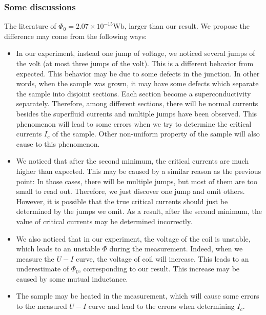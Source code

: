 \subsubsection{Some discussions}

The literature of $\Phi_{0}=2.07\times10^{-15}\mathrm{Wb}$, larger
than our result. We propose the difference may come from the following
ways:
\begin{itemize}
\item In our experiment, instead one jump of voltage, we noticed several jumps
of the volt (at most three jumps of the volt). This is a different
behavior from expected. This behavior may be due to some defects in
the junction. In other words, when the sample was grown, it may have
some defects which separate the sample into disjoint sections. Each
section become a superconductivity separately. Therefore, among different
sections, there will be normal currents besides the superfluid currents
and multiple jumps have been observed. This phenomenon will lead to some
errors when we try to determine the critical currents $I_{c}$ of
the sample. Other non-uniform property of the sample will also cause
to this phenomenon.
\item We noticed that after the second minimum, the critical currents are
much higher than expected. This may be caused by a similar reason
as the previous point: In those cases, there will be multiple jumps,
but most of them are too small to read out. Therefore, we just discover
one jump and omit others. However, it is possible that the true critical
currents should just be determined by the jumps we omit. As a result,
after the second minimum, the value of critical currents may be determined
incorrectly.
\item We also noticed that in our experiment, the voltage of the coil is
unstable, which leads to an unstable $\Phi$ during the measurement.
Indeed, when we measure the $U-I$ curve, the voltage of coil will
increase. This leads to an underestimate of $\Phi_{0}$, corresponding
to our result. This increase may be caused by some mutual inductance.
\item The sample may be heated in the measurement, which will cause some
errors to the measured $U-I$ curve and lead to the errors when determining
$I_{c}$.
\end{itemize}
